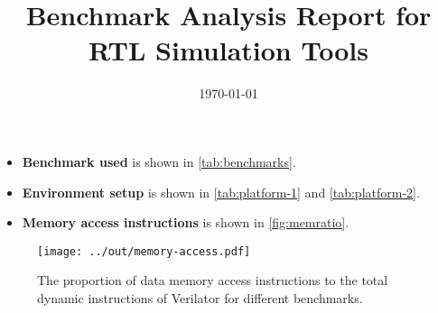 \documentclass{article}
\title{Benchmark Analysis Report for RTL Simulation Tools}
\date{\today}
\author{}
\begin{document}
\maketitle

\begin{itemize}[noitemsep,topsep=0pt]
  \item {\bf Benchmark used} is shown in \autoref{tab:benchmarks}.
  \item {\bf Environment setup} is shown in \autoref{tab:platform-1} and \autoref{tab:platform-2}.
  \item {\bf Memory access instructions } is shown in \autoref{fig:memratio}.
\end{itemize}




\centering


\begin{figure}[h!]
  \centering
  \texttt{[image: ../out/memory-access.pdf]}
  \vspace*{-4mm}
  \caption{The proportion of data memory access instructions to the total dynamic instructions of Verilator for different benchmarks.}
  \label{fig:memratio}
\end{figure}
\end{document}
